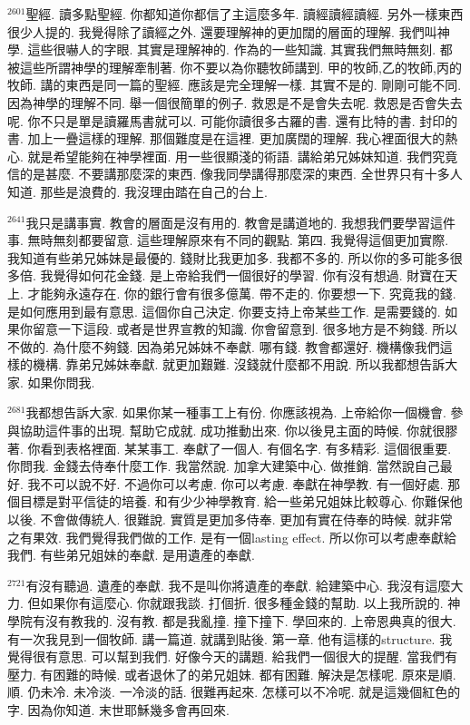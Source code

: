 \documentclass{book}
\begin{document}
$^{2601}$聖經.
讀多點聖經.
你都知道你都信了主這麼多年.
讀經讀經讀經.
另外一樣東西很少人提的.
我覺得除了讀經之外.
還要理解神的更加闊的層面的理解.
我們叫神學.
這些很嚇人的字眼.
其實是理解神的.
作為的一些知識.
其實我們無時無刻.
都被這些所謂神學的理解牽制著.
你不要以為你聽牧師講到.
甲的牧師,乙的牧師,丙的牧師.
講的東西是同一篇的聖經.
應該是完全理解一樣.
其實不是的.
剛剛可能不同.
因為神學的理解不同.
舉一個很簡單的例子.
救恩是不是會失去呢.
救恩是否會失去呢.
你不只是單是讀羅馬書就可以.
可能你讀很多古羅的書.
還有比特的書.
封印的書.
加上一疊這樣的理解.
那個難度是在這裡.
更加廣闊的理解.
我心裡面很大的熱心.
就是希望能夠在神學裡面.
用一些很顯淺的術語.
講給弟兄姊妹知道.
我們究竟信的是甚麼.
不要講那麼深的東西.
像我同學講得那麼深的東西.
全世界只有十多人知道.
那些是浪費的.
我沒理由踏在自己的台上.

$^{2641}$我只是講事實.
教會的層面是沒有用的.
教會是講道地的.
我想我們要學習這件事.
無時無刻都要留意.
這些理解原來有不同的觀點.
第四.
我覺得這個更加實際.
我知道有些弟兄姊妹是最優的.
錢財比我更加多.
我都不多的.
所以你的多可能多很多倍.
我覺得如何花金錢.
是上帝給我們一個很好的學習.
你有沒有想過.
財寶在天上.
才能夠永遠存在.
你的銀行會有很多億萬.
帶不走的.
你要想一下.
究竟我的錢.
是如何應用到最有意思.
這個你自己決定.
你要支持上帝某些工作.
是需要錢的.
如果你留意一下這段.
或者是世界宣教的知識.
你會留意到.
很多地方是不夠錢.
所以不做的.
為什麼不夠錢.
因為弟兄姊妹不奉獻.
哪有錢.
教會都還好.
機構像我們這樣的機構.
靠弟兄姊妹奉獻.
就更加艱難.
沒錢就什麼都不用說.
所以我都想告訴大家.
如果你問我.

$^{2681}$我都想告訴大家.
如果你某一種事工上有份.
你應該視為.
上帝給你一個機會.
參與協助這件事的出現.
幫助它成就.
成功推動出來.
你以後見主面的時候.
你就很膠著.
你看到表格裡面.
某某事工.
奉獻了一個人.
有個名字.
有多精彩.
這個很重要.
你問我.
金錢去侍奉什麼工作.
我當然說.
加拿大建築中心.
做推銷.
當然說自己最好.
我不可以說不好.
不過你可以考慮.
你可以考慮.
奉獻在神學教.
有一個好處.
那個目標是對平信徒的培養.
和有少少神學教育.
給一些弟兄姐妹比較尊心.
你難保他以後.
不會做傳統人.
很難說.
實質是更加多侍奉.
更加有實在侍奉的時候.
就非常之有果效.
我們覺得我們做的工作.
是有一個lasting effect.
所以你可以考慮奉獻給我們.
有些弟兄姐妹的奉獻.
是用遺產的奉獻.

$^{2721}$有沒有聽過.
遺產的奉獻.
我不是叫你將遺產的奉獻.
給建築中心.
我沒有這麼大力.
但如果你有這麼心.
你就跟我談.
打個折.
很多種金錢的幫助.
以上我所說的.
神學院有沒有教我的.
沒有教.
都是我亂撞.
撞下撞下.
學回來的.
上帝恩典真的很大.
有一次我見到一個牧師.
講一篇道.
就講到貼後.
第一章.
他有這樣的structure.
我覺得很有意思.
可以幫到我們.
好像今天的講題.
給我們一個很大的提醒.
當我們有壓力.
有困難的時候.
或者退休了的弟兄姐妹.
都有困難.
解決是怎樣呢.
原來是順.
順.
仍未冷.
未冷淡.
一冷淡的話.
很難再起來.
怎樣可以不冷呢.
就是這幾個紅色的字.
因為你知道.
末世耶穌幾多會再回來.
\end{document}
